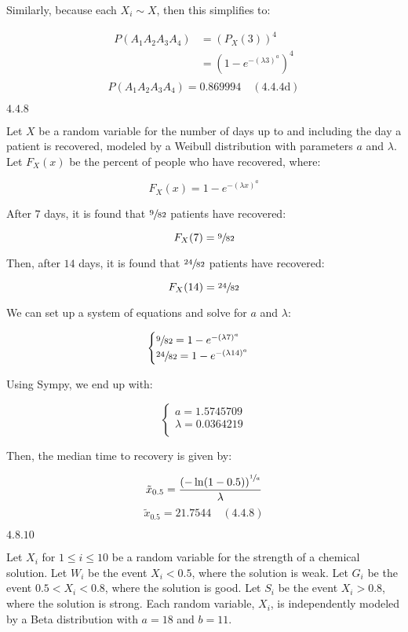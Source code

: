 \documentclass{article}
\newcommand{\problem}[2]{$\boxed{\text{#1.#2}}$}
\newcommand{\solution}[3]{\boxed{#3\quad(\text{#1.#2})}}
\newcommand{\subsolution}[4]{\boxed{#4\quad(\text{#1.#2#3})}}
\newcommand{\multistep}[1]{\begin{array}{rl} #1 \end{array}}
\begin{document}
Similarly, because each $X_i\sim{}X$, then this simplifies to:

\[
\multistep{
P(A_1A_2A_3A_4)&=(P_X(3))^4 \\
&=\left(1-e^{-(\lambda 3)^a}\right)^4 \\
}
\] \[
\subsolution{4.4}{4}{d}{P(A_1A_2A_3A_4)=0.869994}
\]

%
\problem{4.4}{8}

Let $X$ be a random variable for the number of days up to and
including the day a patient is recovered, modeled by a Weibull
distribution with parameters $a$ and $\lambda$. Let $F_X(x)$ be the
percent of people who have recovered, where:

\[
F_X(x)=1-e^{-(\lambda x)^a}
\]

After $7$ days, it is found that $\sfrac{9}{82}$ patients have
recovered:

\[
F_X(7)=\sfrac{9}{82}
\]

Then, after $14$ days, it is found that $\sfrac{24}{82}$ patients have
recovered:

\[
F_X(14)=\sfrac{24}{82}
\]

We can set up a system of equations and solve for $a$ and $\lambda$:

\[
\begin{cases}
\sfrac{9}{82}=1-e^{-(\lambda 7)^a} \\
\sfrac{24}{82}=1-e^{-(\lambda 14)^a} \\
\end{cases}
\]

Using Sympy, we end up with:

\[
\begin{cases}
a=1.5745709 \\
\lambda= 0.0364219 \\
\end{cases}
\]

Then, the median time to recovery is given by:

\[
\tilde{x}_{0.5}=\dfrac{\left(-\ln(1-0.5)\right)^{\sfrac{1}{a}}}{\lambda}
\] \[
\solution{4.4}{8}{\tilde{x}_{0.5}=21.7544}
\]

%
\problem{4.8}{10}

Let $X_i$ for $1\le{}i\le10$ be a random variable for the strength of
a chemical solution. Let $W_i$ be the event $X_i<0.5$, where the
solution is weak. Let $G_i$ be the event $0.5<X_i<0.8$, where the
solution is good. Let $S_i$ be the event $X_i>0.8$, where the solution
is strong. Each random variable, $X_i$, is independently modeled by a
Beta distribution with $a=18$ and $b=11$.
\end{document}
